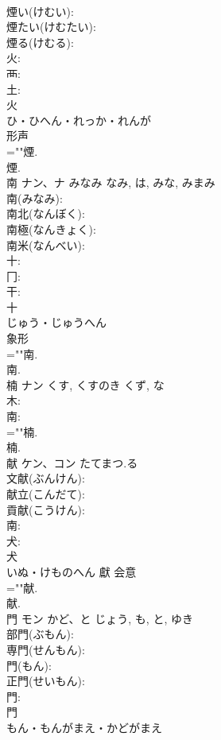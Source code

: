 \documentclass[8pt]{extreport}
\begin{document}
\begin{CJK}{UTF8}{min}
\\	煙い(けむい): 
\\	煙たい(けむたい): 
\\	煙る(けむる): 
\\	火: 
\\	襾: 
\\	土: 
\\	火	
\\	ひ・ひへん・れっか・れんが	
\\	形声 
\\	=""煙.
\\	煙.
\\	南	ナン、ナ	みなみ	なみ, は, みな, みまみ	
\\	南(みなみ): 
\\	南北(なんぼく): 
\\	南極(なんきょく): 
\\	南米(なんべい): 
\\	十: 
\\	冂: 
\\	干: 
\\	十	
\\	じゅう・じゅうへん	
\\	象形 
\\	=""南.
\\	南.
\\	楠	ナン	くす, くすのき	くず, な	
\\	木: 
\\	南: 
\\	=""楠.
\\	楠.
\\	献	ケン、コン	たてまつ.る		
\\	文献(ぶんけん): 
\\	献立(こんだて): 
\\	貢献(こうけん): 
\\	南: 
\\	犬: 
\\	犬	
\\	いぬ・けものへん	獻	会意 
\\	=""献.
\\	献.
\\	門	モン	かど、と	じょう, も, と, ゆき	
\\	部門(ぶもん): 
\\	専門(せんもん): 
\\	門(もん): 
\\	正門(せいもん): 
\\	門: 
\\	門	
\\	もん・もんがまえ・かどがまえ	

\end{CJK}
\end{document}
